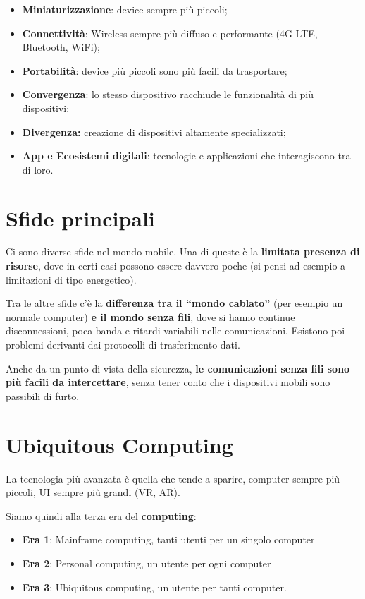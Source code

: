 \begin{itemize}
\item \textbf{Miniaturizzazione}: device sempre più piccoli;
\item \textbf{Connettività}: Wireless sempre più diffuso e performante
  (4G-LTE, Bluetooth, WiFi);
\item \textbf{Portabilità}: device più piccoli sono più facili da
  trasportare;
\item \textbf{Convergenza}: lo stesso dispositivo racchiude le funzionalità
  di più dispositivi;
\item \textbf{Divergenza:} creazione di dispositivi altamente specializzati;
\item \textbf{App e Ecosistemi digitali}: tecnologie e applicazioni che
  interagiscono tra di loro.
\end{itemize}

\section{Sfide principali}

Ci sono diverse sfide nel mondo mobile. Una di queste è la \textbf{limitata
presenza di risorse}, dove in certi casi possono essere davvero poche (si pensi
ad esempio a limitazioni di tipo energetico).

Tra le altre sfide c'è la \textbf{differenza tra il ``mondo cablato''} (per
esempio un normale computer) \textbf{e il mondo senza fili}, dove si hanno
continue disconnessioni, poca banda e ritardi variabili nelle comunicazioni.
Esistono poi problemi derivanti dai protocolli di trasferimento dati.

Anche da un punto di vista della sicurezza, \textbf{le comunicazioni senza fili
sono più facili da intercettare}, senza tener conto che i dispositivi mobili
sono passibili di furto.

\section{Ubiquitous Computing }
\label{ubiquitous-computing}

La tecnologia più avanzata è quella che tende a sparire, computer sempre
più piccoli, UI sempre più grandi (VR, AR).

Siamo quindi alla terza era del \textbf{computing}:

\begin{itemize}
\item \textbf{Era 1}: Mainframe computing, tanti utenti per un singolo computer
\item \textbf{Era 2}: Personal computing, un utente per ogni computer
\item \textbf{Era 3}: Ubiquitous computing, un utente per tanti computer.

\end{itemize}

